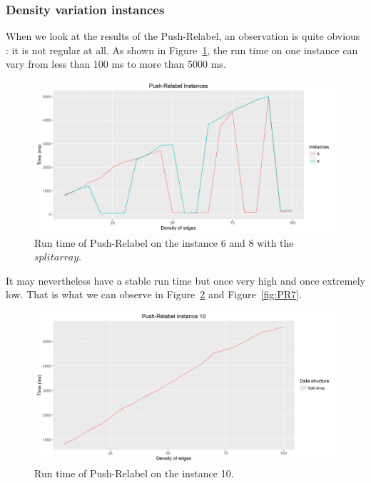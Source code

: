 \subsubsection{Density variation instances}
When we look at the results of the Push-Relabel, an observation is quite obvious : it is not regular at all. As shown in Figure~\ref{fig:PR6}, the run time on one instance can vary from less than 100 ms to more than 5000 ms.
\begin{figure}[H]
\begin{center}
\includegraphics[scale=0.5]{images/pri68.png}
\caption{Run time of Push-Relabel on the instance 6 and 8 with the $split array$.}
\label{fig:PR6}
\end{center}
\end{figure}
It may nevertheless have a stable run time but once very high and once extremely low. That is what we can observe in Figure~\ref{fig:PR10} and Figure~\ref{fig:PR7}.
\begin{figure}[H]
\begin{center}
\includegraphics[scale=0.5]{images/pri10.png}
\caption{Run time of Push-Relabel on the instance 10.}
\label{fig:PR10}
\end{center}
\end{figure}
